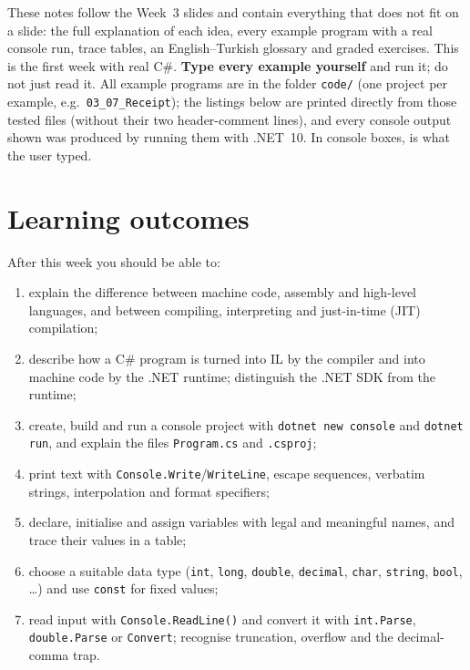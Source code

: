 \makemcmptitle

\begin{notebox}
These notes follow the Week~3 slides and contain everything that does not fit on a slide: the full explanation of each idea, every example program with a real console run, trace tables, an English--Turkish glossary and graded exercises. This is the first week with real C\#. \textbf{Type every example yourself} and run it; do not just read it. All example programs are in the folder \texttt{code/} (one project per example, e.g.\ \texttt{03\_07\_Receipt}); the listings below are printed directly from those tested files (without their two header-comment lines), and every console output shown was produced by running them with .NET~10. In console boxes,  is what the user typed.
\end{notebox}

{\small\tableofcontents}

\section{Learning outcomes}\label{sec:outcomes}
After this week you should be able to:
\begin{enumerate}[leftmargin=*,itemsep=1pt]
  \item explain the difference between machine code, assembly and high-level languages, and between compiling, interpreting and just-in-time (JIT) compilation;
  \item describe how a C\# program is turned into IL by the compiler and into machine code by the .NET runtime; distinguish the .NET SDK from the runtime;
  \item create, build and run a console project with \texttt{dotnet new console} and \texttt{dotnet run}, and explain the files \texttt{Program.cs} and \texttt{.csproj};
  \item print text with \texttt{Console.Write}/\texttt{WriteLine}, escape sequences, verbatim strings, interpolation and format specifiers;
  \item declare, initialise and assign variables with legal and meaningful names, and trace their values in a table;
  \item choose a suitable data type (\texttt{int}, \texttt{long}, \texttt{double}, \texttt{decimal}, \texttt{char}, \texttt{string}, \texttt{bool}, \dots) and use \texttt{const} for fixed values;
  \item read input with \texttt{Console.ReadLine()} and convert it with \texttt{int.Parse}, \texttt{double.Parse} or \texttt{Convert}; recognise truncation, overflow and the decimal-comma trap.
\end{enumerate}

